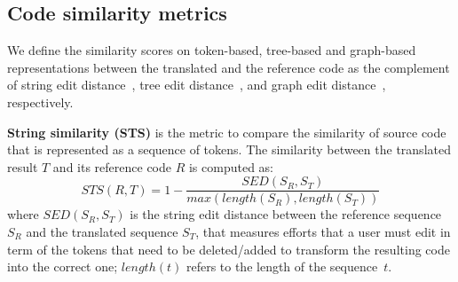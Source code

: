 \subsection{Code similarity metrics}

We define the similarity scores on token-based, tree-based and
graph-based representations between the translated and the
reference code as the complement of string edit
distance~\cite{levenshtein}, tree edit distance~\cite{oopsla10}, and
graph edit distance~\cite{sanfeliu}, respectively.

\textbf{String similarity (STS)} is the metric to compare the
similarity of source code that is represented as a sequence of
tokens. The similarity between the translated result $T$ and its
reference code $R$ is computed as:
$$STS(R, T) = 1 - \frac{SED(S_R, S_T)}{max\left(length(S_R), length(S_T)\right)}$$
where $SED(S_R, S_T)$ is the string edit distance between the
reference sequence $S_R$ and the translated sequence $S_T$, that
measures efforts that a user must edit in term of the tokens that need
to be deleted/added to transform the resulting code into the correct one;
$length(t)$ refers to the length of the sequence~$t$.



